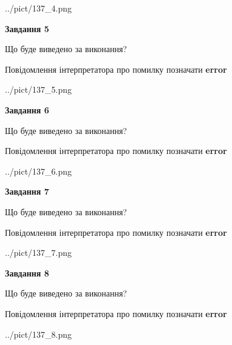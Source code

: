 \documentclass[12pt, ukrainian]{article}
\begin{document}
{\begin{center}
	{../pict/137_4.png}
\end{center}
\newpage

{\begin {center}\textbf{Завдання 5}\end {center}}\par
Що буде виведено за виконання? \par
Повідомлення інтерпретатора про помилку позначати \textbf{error}

\begin{center}
	{../pict/137_5.png}
\end{center}
\newpage

{\begin {center}\textbf{Завдання 6}\end {center}}\par
Що буде виведено за виконання? \par
Повідомлення інтерпретатора про помилку позначати \textbf{error}

\begin{center}
	{../pict/137_6.png}
\end{center}
\newpage

{\begin {center}\textbf{Завдання 7}\end {center}}\par
Що буде виведено за виконання? \par
Повідомлення інтерпретатора про помилку позначати \textbf{error}

\begin{center}
	{../pict/137_7.png}
\end{center}
\newpage

{\begin {center}\textbf{Завдання 8}\end {center}}\par
Що буде виведено за виконання? \par
Повідомлення інтерпретатора про помилку позначати \textbf{error}

\begin{center}
	{../pict/137_8.png}
\end{center}
\newpage

}
\end{document}
